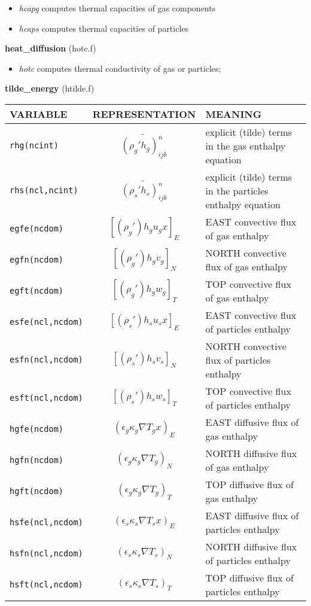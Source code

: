 \begin{itemize}
\item{\em hcapg} computes thermal capacities of gas components 
\item{\em hcaps} computes thermal capacities of particles 
\end{itemize}
%
%
{\large{\bf heat\_diffusion}} (hotc.f)\\
\begin{itemize}
\item{\em hotc} computes thermal conductivity of gas or particles;
\end{itemize}
%
%
{\large {\bf tilde\_energy}} (htilde.f)\\[5mm]
\begin{tabular}{|p{6cm}|c|p{6cm}|}\hline
VARIABLE & REPRESENTATION & MEANING\\\hline
\tt rhg(ncint) & $\widetilde{(\rho_g'h_g)_{ijk}^n}$ & explicit (tilde) terms in the gas enthalpy equation\\\hline
\tt rhs(ncl,ncint)& $\widetilde{(\rho_s' h_s)_{ijk}^n}$ & explicit (tilde) terms in the particles enthalpy equation\\\hline
\tt egfe(ncdom) & $\left[ (\rho_g')h_g u_g x \right]_{E}$ &EAST convective flux of gas enthalpy\\\hline
\tt egfn(ncdom) & $\left[ (\rho_g')h_g v_g \right]_{N}$ &NORTH convective flux of gas enthalpy\\\hline
\tt egft(ncdom) & $\left[ (\rho_g')h_g w_g \right]_{T}$ &TOP convective flux of gas enthalpy\\\hline
\tt esfe(ncl,ncdom)& $\left[ (\rho_s')h_su_s x\right]_{E}$ &EAST convective flux of particles enthalpy\\\hline
\tt esfn(ncl,ncdom)& $\left[ (\rho_s')h_sv_s \right]_{N}$ &NORTH convective flux of particles enthalpy\\\hline
\tt esft(ncl,ncdom)& $\left[ (\rho_s')h_sw_s \right]_{T}$ &TOP convective flux of particles enthalpy\\\hline
\tt hgfe(ncdom)&$ (\epsilon_g \kappa_g \nabla T_gx)_{E}$ &EAST diffusive flux of gas enthalpy\\\hline
\tt hgfn(ncdom)&$ (\epsilon_g \kappa_g \nabla T_g)_{N}$ &NORTH diffusive flux of gas enthalpy\\\hline
\tt hgft(ncdom)&$ (\epsilon_g \kappa_g \nabla T_g)_{T}$ &TOP diffusive flux of gas enthalpy\\\hline
\tt hsfe(ncl,ncdom)&$ (\epsilon_s \kappa_s \nabla T_sx)_{E}$ &EAST diffusive flux of particles enthalpy\\\hline
\tt hsfn(ncl,ncdom)&$ (\epsilon_s \kappa_s \nabla T_s)_{N}$ &NORTH diffusive flux of particles enthalpy\\\hline
\tt hsft(ncl,ncdom)&$ (\epsilon_s \kappa_s \nabla T_s)_{T}$ &TOP diffusive flux of particles enthalpy\\\hline
\end{tabular}\\

